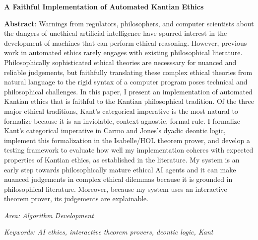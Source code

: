 \documentclass[11pt]{article}
\begin{document}
\noindent \textbf{A Faithful Implementation of Automated Kantian Ethics}

\medskip 

\noindent \textbf{Abstract}: Warnings from regulators, philosophers, and computer scientists about the 
dangers of unethical artificial intelligence have spurred interest in the development 
of machines that can perform ethical reasoning. However, previous work in automated ethics rarely 
engages with existing philosophical literature. Philosophically sophisticated ethical theories are necesssary
for nuanced and reliable judgements, but faithfully translating these complex ethical theories
from natural language to the rigid syntax of a computer program poses technical and philosophical 
challenges. In this paper, I present an implementation of automated Kantian 
ethics that is faithful to the Kantian philosophical tradition. Of the three major ethical 
traditions, Kant's categorical imperative is the most natural to formalize because it is an inviolable, 
context-agnostic, formal rule.  I formalize Kant's categorical imperative 
in Carmo and Jones's dyadic deontic logic, implement this formalization 
in the Isabelle/HOL theorem prover, and develop a testing framework to evaluate how well 
my implementation coheres with expected properties of Kantian ethics, as established in the literature. 
My system is an early step towards philosophically mature ethical AI agents and it can make nuanced 
judgements in complex ethical dilemmas because it is grounded in philosophical literature. Moreover, 
because my system uses an interactive theorem prover, its judgements are explainable.


\smallskip
\noindent \emph{Area: Algorithm Development}

\noindent \emph{Keywords: AI ethics, interactive theorem provers, deontic logic, Kant}
\end{document}
